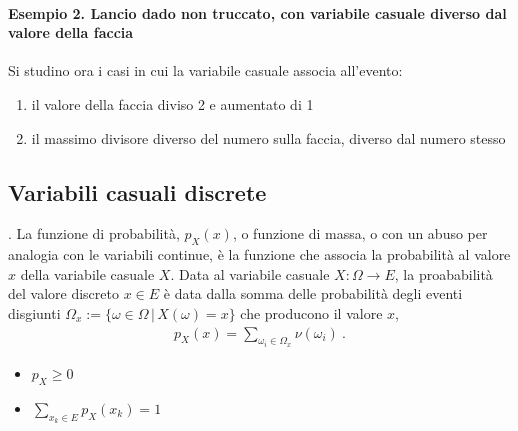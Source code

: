 \documentclass[letterpaper,10pt,italian]{jupyterBook}
\begin{document}
\paragraph{Esempio 2. Lancio dado non truccato, con variabile casuale diverso dal valore della faccia}
\label{\detokenize{ch/statistics/random_variables_definition:esempio-2-lancio-dado-non-truccato-con-variabile-casuale-diverso-dal-valore-della-faccia}}
\sphinxAtStartPar
Si studino ora i casi in cui la variabile casuale associa all’evento:
\begin{enumerate}
%
\item {} 
\sphinxAtStartPar
il valore della faccia diviso 2 e aumentato di 1

\item {} 
\sphinxAtStartPar
il massimo divisore diverso del numero sulla faccia, diverso dal numero stesso

\end{enumerate}

\sphinxstepscope


\subsection{Variabili casuali discrete}
\label{\detokenize{ch/statistics/random_variables_discrete:variabili-casuali-discrete}}\label{\detokenize{ch/statistics/random_variables_discrete:statistics-hs-random-variables-discrete}}\label{\detokenize{ch/statistics/random_variables_discrete::doc}}
\sphinxAtStartPar
{}.
La funzione di probabilità, \(p_X(x)\), o funzione di massa, o  con un abuso per analogia con le variabili continue, è la funzione che associa la probabilità al valore \(x\) della variabile casuale \(X\). Data al variabile casuale \(X: \Omega \rightarrow E\), la proababilità del valore discreto \(x \in E\) è data dalla somma delle probabilità degli eventi disgiunti \(\Omega_x := \{ \omega \in \Omega \, | \, X(\omega) = x \}\) che producono il valore \(x\),
\begin{equation*}
\begin{split}p_X(x) = \sum_{\omega_i \in \Omega_x} \nu(\omega_i) \ .\end{split}
\end{equation*}
\sphinxAtStartPar
{}
\begin{itemize}
\item {} 
\sphinxAtStartPar
\(p_X \ge 0\)

\item {} 
\sphinxAtStartPar
\(\sum_{x_k \in E} p_X(x_k) = 1\)

\end{itemize}
\end{document}
